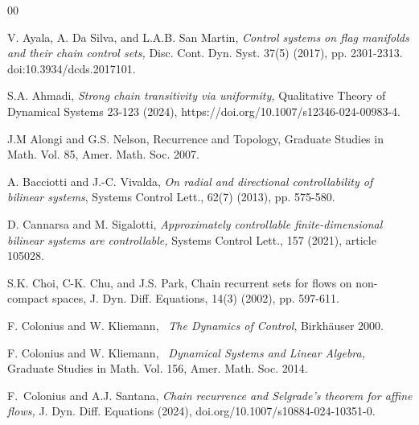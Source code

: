 \documentclass[preprint,12pt]{elsarticle}
\begin{document}





\begin{thebibliography}{00}



 V. Ayala, A. Da Silva, and L.A.B. San Martin,
 \textit{Control systems on flag manifolds and their chain control sets,} Disc.
Cont. Dyn. Syst. 37(5) (2017), pp. 2301-2313. doi:10.3934/dcds.2017101.

 S.A. Ahmadi,  \textit{Strong chain transitivity via
uniformity,} Qualitative Theory of Dynamical Systems 23-123 (2024), https://doi.org/10.1007/s12346-024-00983-4.

 J.M Alongi and G.S. Nelson, Recurrence and
Topology, Graduate Studies in Math. Vol. 85, Amer. Math. Soc. 2007.

 A. Bacciotti and J.-C. Vivalda,  \textit{On radial and
directional controllability of bilinear systems}, Systems Control Lett., 62(7)
(2013), pp. 575-580.

 D. Cannarsa and M. Sigalotti,  \textit{Approximately
controllable finite-dimensional bilinear systems are controllable,} Systems
Control Lett., 157 (2021), article 105028.

 S.K. Choi, C-K. Chu, and J.S. Park, Chain
recurrent sets for flows on non-compact spaces, J. Dyn. Diff. Equations, 14(3)
(2002), pp. 597-611.

 F. Colonius and W. Kliemann, \textit{\ The Dynamics of
Control}, Birkh\"{a}user 2000.

 F. Colonius and W. Kliemann, \textit{\ Dynamical
Systems and Linear Algebra, }Graduate Studies in Math. Vol. 156, Amer. Math.
Soc. 2014.

 F.~Colonius and A.J. Santana,  \textit{Chain
recurrence and Selgrade's theorem for affine flows,} J. Dyn. Diff. Equations
(2024), doi.org/10.1007/s10884-024-10351-0.


\end{thebibliography}
\end{document}
